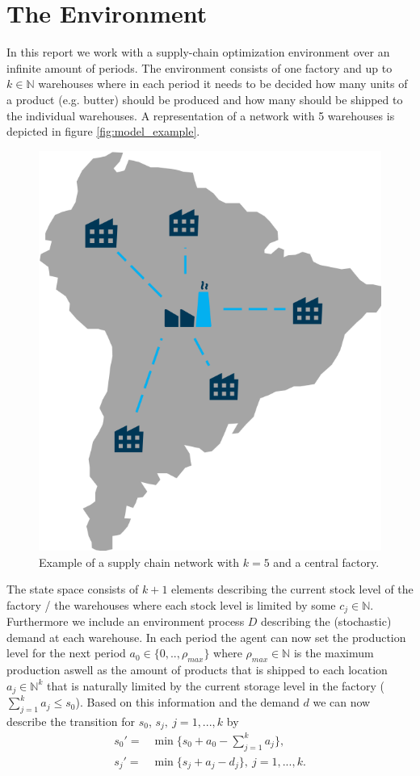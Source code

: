 \documentclass[journal, a4paper]{IEEEtran}
\theoremstyle{plain}
\theoremstyle{definition}
\begin{document}
\section{The Environment}
In this report we work with a supply-chain optimization environment over an infinite amount of periods. The environment consists of one factory and up to $k \in \mathbb{N}$ warehouses where in each period it needs to be decided how many units of a product (e.g. butter) should be produced and how many should be shipped to the individual warehouses. A representation of a network with 5 warehouses is depicted in figure \ref{fig:model_example}. 
\begin{figure}[h]
	\label{fig:model_example}
	\centering
	\includegraphics[width=0.5\columnwidth]{model.png}
	\caption{\label{a_figure}Example of a supply chain network with $k=5$ and a central factory.}
\end{figure}
The state space consists of $k+1$ elements describing the current stock level of the factory / the warehouses where each stock level is limited by some $c_j \in \mathbb{N}$. Furthermore we include an environment process $D$ describing the (stochastic) demand at each warehouse. In each period the agent can now set the production level for the next period $a_0 \in \{0,.., \rho_{max}\}$ where $\rho_{max} \in \mathbb{N}$ is the maximum production aswell as the amount of products that is shipped to each location $a_j \in \mathbb{N}^k$ that is naturally limited by the current storage level in the factory ($\sum_{j=1}^{k}a_j \leq s_0$). Based on this information and the demand $d$ we can now describe the transition for $s_0$, $s_j, \ j = 1,..., k$ by
\begin{equation}
	\begin{split}
		s_0' = &\min\{s_0 + a_0 - \sum_{j=1}^{k}a_j \}, \\
		s_j' = &\min\{s_j + a_j - d_j\}, \ j=1,...,k.
	\end{split}
	\end{equation}
\end{document}
